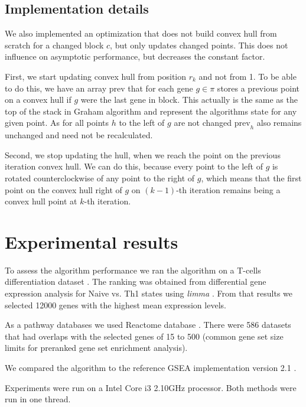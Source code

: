 \documentclass[runningheads,a4paper]{llncs}
\begin{document}
\subsection{Implementation details}

We also implemented an optimization that 
does not build convex hull from scratch for a changed block $c$,
but only updates changed points. This does not influence on
asymptotic performance, but decreases the constant factor.

First, we start updating convex hull from position $r_k$ and
not from 1. To be able to do this, we have an array $\mathrm{prev}$ that for
each gene $g \in \pi$ stores a previous point on a convex hull
if $g$ were the last gene in block. This actually is the same as 
the top of the stack in Graham algorithm and represent
the algorithms state for any given point. 
As for all points $h$ to the left of $g$ are not changed $\mathrm{prev}_h$
also remains unchanged and need not be recalculated.

Second, we stop updating the hull, when we reach the point on the
previous iteration convex hull.
We can do this, because every point
to the left of $g$ is rotated counterclockwise of any point to the 
right of $g$, which means that the first point on the convex
hull right of $g$ on $(k-1)$-th iteration remains being a convex hull point
at $k$-th iteration.

\section{Experimental results}\label{section_experiments}

To assess the algorithm performance we ran the algorithm 
on a T-cells differentiation dataset \cite{Wei2009}.
The ranking was obtained from differential gene expression analysis
for Naive vs. Th1 states using \emph{limma} \cite{Ritchie2015}.
From that results we selected 12000 genes with the highest
mean expression levels.

As a pathway databases we used Reactome database \cite{Joshi-Tope2005}.
There were 586 datasets that had overlaps with the selected genes
of 15 to 500 (common gene set size limits for preranked 
gene set enrichment analysis).

We compared the algorithm to the reference GSEA implementation version 2.1
\cite{Subramanian2005}.

Experiments were run on a Intel Core i3 2.10GHz processor. Both methods
were run in one thread.
\end{document}
